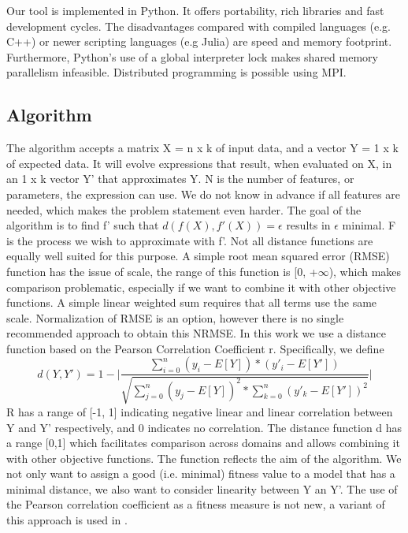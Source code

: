 Our tool is implemented in Python. It offers portability, rich libraries and fast development cycles. The disadvantages compared with compiled languages (e.g. C++) or newer scripting languages (e.g Julia) are speed and memory footprint.
Furthermore, Python's use of a global interpreter lock makes shared memory parallelism infeasible. Distributed programming is possible using MPI.
\subsection{Algorithm}
The algorithm accepts a matrix X = n x k of input data, and a vector Y = 1 x k of expected data. It will evolve expressions that result, when evaluated on X, in an 1 x k vector Y' that approximates Y. N is the number of features, or parameters, the expression can use. We do not know in advance if all features are needed, which makes the problem statement even harder.
The goal of the algorithm is to find f' such that
$
d(f(X), f'(X))=\epsilon
$
results in $\epsilon$ minimal. F is the process we wish to approximate with f'.
Not all distance functions are equally well suited for this purpose. A simple root mean squared error (RMSE) function has the issue of scale, the range of this function is [0, +$\infty$), which makes comparison problematic, especially if we want to combine it with other objective functions. A simple linear weighted sum requires that all terms use the same scale.
Normalization of RMSE is an option, however there is no single recommended approach to obtain this NRMSE.
In this work we use a distance function based on the Pearson Correlation Coefficient r. Specifically, we define
\[
d(Y, Y') = 1 - 
\lvert \frac{\sum_{i=0}^{n}{(y_i-E[Y])*(y'_i-E[Y'])}}{\sqrt{\sum_{j=0}^{n}{(y_j-E[Y])^2}*\sum_{k=0}^{n}{(y'_k-E[Y'])^2}}}
 \lvert 
 \]
R has a range of [-1, 1] indicating negative linear and linear correlation between Y and Y' respectively, and 0 indicates no correlation. The distance function d has a range [0,1] which facilitates comparison across domains and allows combining it with other objective functions. The function reflects the aim of the algorithm. We not only want to assign a good (i.e. minimal) fitness value to a model that has a minimal distance, we also want to consider linearity between Y an Y'. The use of the Pearson correlation coefficient as a fitness measure is not new, a variant of this approach is used in \citep{pearson}.
